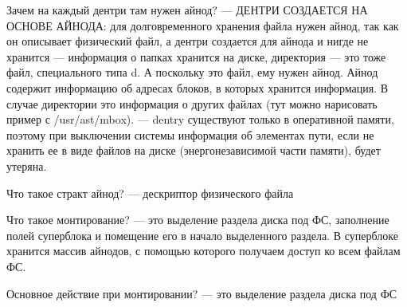 Зачем на каждый дентри там нужен айнод? --- ДЕНТРИ СОЗДАЕТСЯ НА ОСНОВЕ АЙНОДА: для долговременного хранения файла нужен айнод, так как он описывает физический файл, а дентри создается для айнода и нигде не хранится --- информация о папках хранится на диске, директория — это тоже файл, специального типа d. А поскольку это файл, ему нужен айнод. Айнод содержит информацию об адресах блоков, в которых хранится информация. В случае директории это информация о других файлах (тут можно нарисовать пример с /usr/ast/mbox). --- dentry существуют только в оперативной памяти, поэтому при выключении системы информация об элементах пути, если не хранить ее в виде файлов на диске (энергонезависимой части памяти), будет утеряна.

Что такое стракт айнод? --- дескриптор физического файла

Что такое монтирование? --- это выделение раздела диска под ФС, заполнение полей суперблока и помещение его в начало выделенного раздела. В суперблоке хранится массив айнодов, с помощью которого получаем доступ ко всем файлам ФС.

Основное действие при монтировании? --- это выделение раздела диска под ФС


